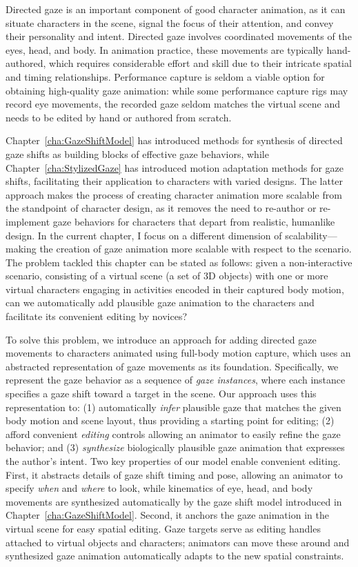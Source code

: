 Directed gaze is an important component of good character animation, as it can situate characters in the scene, signal the focus of their attention, and convey their personality and intent. Directed gaze involves coordinated movements of the eyes, head, and body. In animation practice, these movements are typically hand-authored, which requires considerable effort and skill due to their intricate spatial and timing relationships. Performance capture is seldom a viable option for obtaining high-quality gaze animation: while some performance capture rigs may record eye movements, the recorded gaze seldom matches the virtual scene and needs to be edited by hand or authored from scratch.

Chapter~\ref{cha:GazeShiftModel} has introduced methods for synthesis of directed gaze shifts as building blocks of effective gaze behaviors, while Chapter~\ref{cha:StylizedGaze} has introduced motion adaptation methods for gaze shifts, facilitating their application to characters with varied designs. The latter approach makes the process of creating character animation more scalable from the standpoint of character design, as it removes the need to re-author or re-implement gaze behaviors for characters that depart from realistic, humanlike design. In the current chapter, I focus on a different dimension of scalability---making the creation of gaze animation more scalable with respect to the scenario. The problem tackled this chapter can be stated as follows: given a non-interactive scenario, consisting of a virtual scene (a set of 3D objects) with one or more virtual characters engaging in activities encoded in their captured body motion, can we automatically add plausible gaze animation to the characters and facilitate its convenient editing by novices?

To solve this problem, we introduce an approach for adding directed gaze movements to characters animated using full-body motion capture, which uses an abstracted representation of gaze movements as its foundation. Specifically, we represent the gaze behavior as a sequence of \emph{gaze instances}, where each instance specifies a gaze shift toward a target in the scene. Our approach uses this representation to: (1) automatically \emph{infer} plausible gaze that matches the given body motion and scene layout, thus providing a starting point for editing; (2) afford convenient \emph{editing} controls allowing an animator to easily refine the gaze behavior; and (3) \emph{synthesize} biologically plausible gaze animation that expresses the author's intent. Two key properties of our model enable convenient editing. First, it abstracts details of gaze shift timing and pose, allowing an animator to specify \emph{when} and \emph{where} to look, while kinematics of eye, head, and body movements are synthesized automatically by the gaze shift model introduced in Chapter~\ref{cha:GazeShiftModel}. Second, it anchors the gaze animation in the virtual scene for easy spatial editing. Gaze targets serve as editing handles attached to virtual objects and characters; animators can move these around and synthesized gaze animation automatically adapts to the new spatial constraints.

